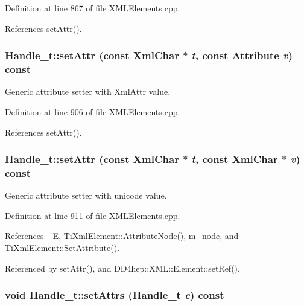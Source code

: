 Definition at line 867 of file XMLElements.cpp.

References setAttr().\hypertarget{class_d_d4hep_1_1_x_m_l_1_1_handle__t_abedae36966ec06e44f284236f0660ae9}{
\subsubsection[{setAttr}]{ Handle\_\-t::setAttr (const {\bf XmlChar} $\ast$ {\em t}, \/  const {\bf Attribute} {\em v}) const}}
\label{class_d_d4hep_1_1_x_m_l_1_1_handle__t_abedae36966ec06e44f284236f0660ae9}


Generic attribute setter with XmlAttr value. 

Definition at line 906 of file XMLElements.cpp.

References setAttr().\hypertarget{class_d_d4hep_1_1_x_m_l_1_1_handle__t_a30ccb0db68774688528abd87bc065fbd}{
\subsubsection[{setAttr}]{ Handle\_\-t::setAttr (const {\bf XmlChar} $\ast$ {\em t}, \/  const {\bf XmlChar} $\ast$ {\em v}) const}}
\label{class_d_d4hep_1_1_x_m_l_1_1_handle__t_a30ccb0db68774688528abd87bc065fbd}


Generic attribute setter with unicode value. 

Definition at line 911 of file XMLElements.cpp.

References \_\-E, TiXmlElement::AttributeNode(), m\_\-node, and TiXmlElement::SetAttribute().

Referenced by setAttr(), and DD4hep::XML::Element::setRef().\hypertarget{class_d_d4hep_1_1_x_m_l_1_1_handle__t_a2e9ebb15715fabaa1b781bcf21ee3255}{
\subsubsection[{setAttrs}]{\setlength{\rightskip}{0pt plus 5cm}void Handle\_\-t::setAttrs ({\bf Handle\_\-t} {\em e}) const}}
\label{class_d_d4hep_1_1_x_m_l_1_1_handle__t_a2e9ebb15715fabaa1b781bcf21ee3255}



